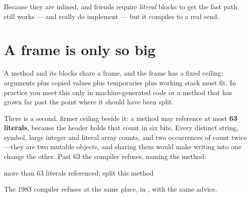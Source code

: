 \begin{stwarn}
Because they are inlined,  and friends require \emph{literal}
blocks to get the fast path.  still works
---  and  really do implement  --- but it
compiles to a real send.
\end{stwarn}

\section{A frame is only so big}

A method and its blocks share a frame, and the frame has a fixed ceiling:
arguments plus copied values plus temporaries plus working stack must fit. In
practice you meet this only in machine-generated code or a method that has
grown far past the point where it should have been split.

There is a second, firmer ceiling beside it: a method may reference at most
\textbf{63 literals}, because the header holds that count in six bits. Every
distinct string, symbol, large integer and literal array counts, and two
occurrences of  count twice---they are two mutable objects, and
sharing them would make writing into one change the other. Past 63 the
compiler refuses, naming the method:

\begin{plain}
more than 63 literals referenced; split this method
\end{plain}

The 1983 compiler refuses at the same place, in , with
the same advice.
